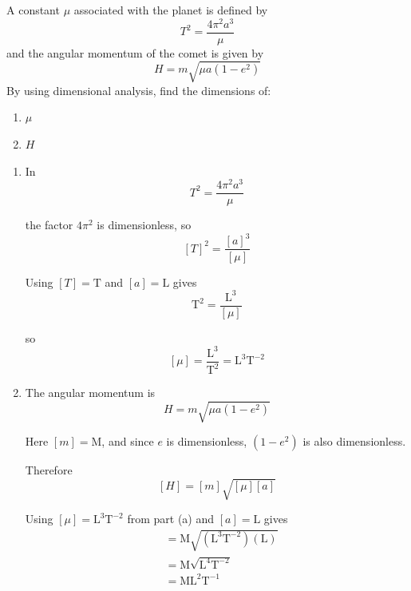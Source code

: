 \documentclass[leqno]{article}
\begin{document}
\begin{enumerate}[
  label=\textbf{\arabic*.},
  leftmargin=*,
  topsep=0pt,
  partopsep=0pt,
  parsep=0pt
]
A constant $\mu$ associated with the planet is defined by
\[
T^2 = \frac{4\pi^2 a^3}{\mu}
\]
and the angular momentum of the comet is given by
\[
H = m\sqrt{\mu a(1-e^2)}
\]
By using dimensional analysis, find the dimensions of:

\begin{enumerate}[label=\textbf{(\alph*)}]
  \item $\mu$ 
  \item $H$ 
\end{enumerate}

\vspace*{10pt}

\begin{djsSolution}
\begin{enumerate}[label=\textbf{(\alph*)}, start=1]
  \item In
  \[
  T^2=\frac{4\pi^2a^3}{\mu}
  \]

  the factor \(4\pi^2\) is dimensionless, so
  \[
  [T]^2=\frac{[a]^3}{[\mu]}
  \]

  Using \([T]=\mathrm{T}\) and \([a]=\mathrm{L}\) gives
  \[
  \mathrm{T^2}=\frac{\mathrm{L^3}}{[\mu]}
  \]

  so
  \[
  [\mu]=\frac{\mathrm{L^3}}{\mathrm{T^2}}=\mathrm{L^3T^{-2}}
  \]

  \item The angular momentum is
  \[
  H=m\sqrt{\mu a(1-e^2)}
  \]

  Here \([m]=\mathrm{M}\), and since \(e\) is dimensionless, \((1-e^2)\) is also dimensionless.

  Therefore
  \[
  [H]=[m]\sqrt{[\mu][a]}
  \]

  Using \([\mu]=\mathrm{L^3T^{-2}}\) from part (a) and \([a]=\mathrm{L}\) gives
  \begin{align*}
  [H] &= \mathrm{M}\sqrt{(\mathrm{L^3T^{-2}})(\mathrm{L})} \\
       &= \mathrm{M}\sqrt{\mathrm{L^4T^{-2}}} \\
       &= \mathrm{ML^2T^{-1}}
  \end{align*}
\end{enumerate}
\end{djsSolution}


\newpage

\questionitem


\end{enumerate}
\end{document}
